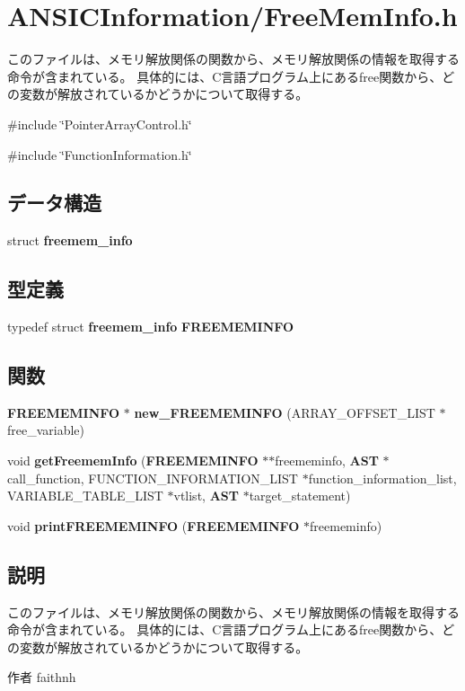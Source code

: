 \section{ANSICInformation/FreeMemInfo.h}
\label{FreeMemInfo_8h}


このファイルは、メモリ解放関係の関数から、メモリ解放関係の情報を取得する命令が含まれている。 具体的には、C言語プログラム上にあるfree関数から、どの変数が解放されているかどうかについて取得する。  


{\ttfamily \#include \char`\"{}PointerArrayControl.h\char`\"{}}\par
{\ttfamily \#include \char`\"{}FunctionInformation.h\char`\"{}}\par
\subsection*{データ構造}
\begin{DoxyCompactItemize}
\item 
struct {\bf freemem\_\-info}
\end{DoxyCompactItemize}
\subsection*{型定義}
\begin{DoxyCompactItemize}
\item 
typedef struct {\bf freemem\_\-info} {\bf FREEMEMINFO}
\end{DoxyCompactItemize}
\subsection*{関数}
\begin{DoxyCompactItemize}
\item 
{\bf FREEMEMINFO} $\ast$ {\bf new\_\-FREEMEMINFO} (ARRAY\_\-OFFSET\_\-LIST $\ast$free\_\-variable)
\item 
void {\bf getFreememInfo} ({\bf FREEMEMINFO} $\ast$$\ast$freememinfo, {\bf AST} $\ast$call\_\-function, FUNCTION\_\-INFORMATION\_\-LIST $\ast$function\_\-information\_\-list, VARIABLE\_\-TABLE\_\-LIST $\ast$vtlist, {\bf AST} $\ast$target\_\-statement)
\item 
void {\bf printFREEMEMINFO} ({\bf FREEMEMINFO} $\ast$freememinfo)
\end{DoxyCompactItemize}


\subsection{説明}
このファイルは、メモリ解放関係の関数から、メモリ解放関係の情報を取得する命令が含まれている。 具体的には、C言語プログラム上にあるfree関数から、どの変数が解放されているかどうかについて取得する。 \begin{DoxyAuthor}{作者}
faithnh 
\end{DoxyAuthor}


